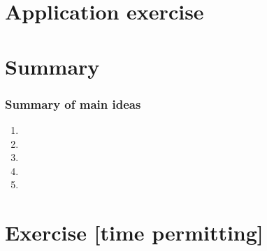 \documentclass[11pt,containsverbatim,handout,xcolor=xelatex,dvipsnames,table]{beamer}
\begin{document}

\section{Application exercise}


\begin{frame}
\frametitle{}

\vfill


\vfill

\end{frame}


\section{Summary}


\begin{frame}
\frametitle{Summary of main ideas}

\vfill

\begin{enumerate}

\item {}

\item {}

\item {}

\item {}

\item {}

\end{enumerate}

\vfill

\end{frame}


\section{Exercise [time permitting]}

\end{document}
